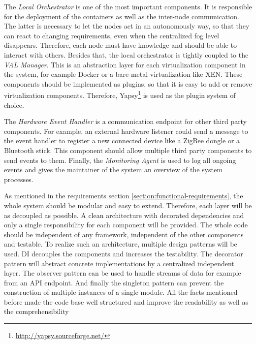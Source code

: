 The \textit{Local Orchestrator} is one of the most important components.
It is responsible for the deployment of the containers as well as the inter-node communication.
The latter is necessary to let the nodes act in an autonomously way, so that they can react to changing requirements, even when the centralized fog level disappears.
Therefore, each node must have knowledge and should be able to interact with others.
Besides that, the local orchestrator is tightly coupled to the \textit{\ac{VAL} Manager}.
This is an abstraction layer for each virtualization component in the system, for example Docker or a bare-metal virtualization like XEN.
These components should be implemented as plugins, so that it is easy to add or remove virtualization components.
Therefore, Yapsy\footnote{\url{http://yapsy.sourceforge.net/}} is used as the plugin system of choice.

The \textit{Hardware Event Handler} is a communication endpoint for other third party components.
For example, an external hardware listener could send a message to the event handler to register a new connected device like a ZigBee dongle or a Bluetooth stick.
This component should allow multiple third party components to send events to them.
Finally, the \textit{Monitoring Agent} is used to log all ongoing events and gives the maintainer of the system an overview of the system processes.

As mentioned in the requirements section \ref{section:functional-requirements}, the whole system should be modular and easy to extend.
Therefore, each layer will be as decoupled as possible.
A clean architecture with decorated dependencies and only a single responsibility for each component will be provided.
The whole code should be independent of any framework, independent of the other components and testable.
To realize such an architecture, multiple design patterns will be used.
\ac{DI} decouples the components and increases the testability.
The decorator pattern will abstract concrete implementations by a centralized independent layer.
The observer pattern can be used to handle streams of data for example from an \ac{API} endpoint.
And finally the singleton pattern can prevent the construction of multiple instances of a single module.
All the facts mentioned before made the code base well structured and improve the readability as well as the comprehensibility


